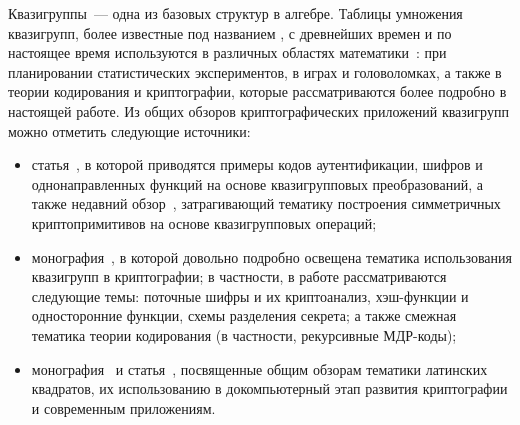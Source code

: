 {\actuality} 

    Квазигруппы~--- одна из базовых структур в алгебре.
    Таблицы умножения квазигрупп, более известные под названием , с древнейших времен и по настоящее время используются в различных областях математики~\autocite{keedwell}: при планировании статистических экспериментов, в играх и головоломках, а также в теории кодирования и криптографии, которые рассматриваются более подробно в настоящей работе.
    Из общих обзоров криптографических приложений квазигрупп можно отметить следующие источники:
    \begin{itemize}
        \item статья~\autocite{glukhov}, в которой приводятся примеры кодов аутентификации, шифров и однонаправленных функций на основе квазигрупповых преобразований, а также недавний обзор~\autocite{chauhan2021quasigroups}, затрагивающий тематику построения симметричных криптопримитивов на основе квазигрупповых операций;
        \item монография~\autocite{shcherbacov2017elements}, в которой довольно подробно освещена тематика использования квазигрупп в криптографии; в частности, в работе рассматриваются следующие темы: поточные шифры и их криптоанализ, хэш-функции и односторонние функции, схемы разделения секрета; а также смежная тематика теории кодирования (в частности, рекурсивные МДР-коды);
        \item монография~\autocite{keedwell} и статья~\autocite{tuzhilin2012}, посвященные общим обзорам тематики латинских квадратов, их использованию в докомпьютерный этап развития криптографии и современным приложениям.
    \end{itemize}

